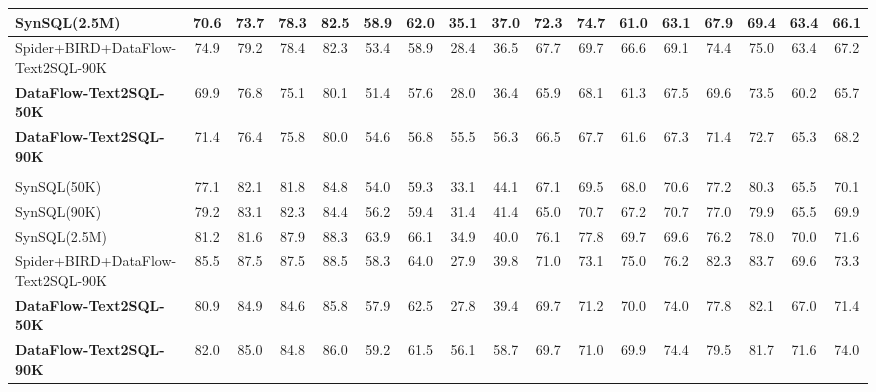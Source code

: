 \begin{table}[t]
{\begin{tabular}{l|cccccccccccccc|cc}
SynSQL(2.5M) & 70.6 & 73.7 & 78.3 & 82.5 & 58.9 & 62.0 & 35.1 & 37.0 & 72.3 & 74.7 & 61.0 & 63.1 & 67.9 & 69.4 & 63.4 & 66.1 \\
\midrule
Spider+BIRD+DataFlow-Text2SQL-90K & 74.9 & 79.2 & 78.4 & 82.3 & 53.4 & 58.9 & 28.4 & 36.5 & 67.7 & 69.7 & 66.6 & 69.1 & 74.4 & 75.0 & 63.4 & 67.2 \\
\midrule
\textbf{DataFlow-Text2SQL-50K} & 69.9 & 76.8 & 75.1 & 80.1 & 51.4 & 57.6 & 28.0 & 36.4 & 65.9 & 68.1 & 61.3 & 67.5 & 69.6 & 73.5 & 60.2 & 65.7 \\
\textbf{DataFlow-Text2SQL-90K} & 71.4 & 76.4 & 75.8 & 80.0 & 54.6 & 56.8 & 55.5 & 56.3 & 66.5 & 67.7 & 61.6 & 67.3 & 71.4 & 72.7 & 65.3 & 68.2 \\


\midrule
\rowcolor[rgb]{.867, .922, .969}
\multicolumn{17}{c}{\textit{\textbf{Trained on Qwen2.5-Coder-7B-Instruct}}} \\
\midrule
SynSQL(50K) & 77.1 & 82.1 & 81.8 & 84.8 & 54.0 & 59.3 & 33.1 & 44.1 & 67.1 & 69.5 & 68.0 & 70.6 & 77.2 & 80.3 & 65.5 & 70.1\\
SynSQL(90K) & 79.2 & 83.1 & 82.3 & 84.4 & 56.2 & 59.4 & 31.4 & 41.4 & 65.0 & 70.7 & 67.2 & 70.7 & 77.0 & 79.9 & 65.5 & 69.9 \\
SynSQL(2.5M) & 81.2 & 81.6 & 87.9 & 88.3 & 63.9 & 66.1 & 34.9 & 40.0 & 76.1 & 77.8 & 69.7 & 69.6 & 76.2 & 78.0 & 70.0 & 71.6 \\
\midrule
Spider+BIRD+DataFlow-Text2SQL-90K & 85.5 & 87.5 & 87.5 & 88.5 & 58.3 & 64.0 & 27.9 & 39.8 & 71.0 & 73.1 & 75.0 & 76.2 & 82.3 & 83.7 & 69.6 & 73.3 \\
\midrule
\textbf{DataFlow-Text2SQL-50K} & 80.9 & 84.9 & 84.6 & 85.8 & 57.9 & 62.5 & 27.8 & 39.4 & 69.7 & 71.2 & 70.0 & 74.0 & 77.8 & 82.1 & 67.0 & 71.4 \\
\textbf{DataFlow-Text2SQL-90K} & 82.0 & 85.0 & 84.8 & 86.0 & 59.2 & 61.5 & 56.1 & 58.7 & 69.7 & 71.0 & 69.9 & 74.4 & 79.5 & 81.7 & 71.6 & 74.0 \\
\bottomrule
\end{tabular}%
}
\end{table}